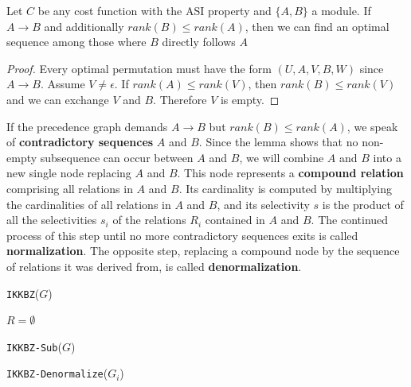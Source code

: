 \documentclass[11pt]{article}
\begin{document}
\begin{lemma}[]
\label{3.2.5}
Let \(C\) be any cost function with the ASI property and \(\{A,B\}\) a module. If \(A\to B\) and
additionally \(rank(B)\le rank(A)\), then we can find an optimal sequence among those where \(B\) directly
follows \(A\)
\end{lemma}

\begin{proof}
Every optimal permutation must have the form \((U,A,V,B,W)\) since \(A\to B\). Assume \(V\neq\epsilon\).
If \(rank(A)\le rank(V)\), then \(rank(B)\le rank(V)\) and we can exchange \(V\) and \(B\). Therefore \(V\) is empty.
\end{proof}

If the precedence graph demands \(A\to B\) but \(rank(B)\le rank(A)\), we speak of \textbf{contradictory
sequences} \(A\) and \(B\). Since the lemma shows that no non-empty subsequence can occur between \(A\)
and \(B\), we will combine \(A\) and \(B\) into a new single node replacing \(A\) and \(B\). This node
represents a \textbf{compound relation} comprising all relations in \(A\) and \(B\). Its cardinality is computed by
multiplying the cardinalities of all relations in \(A\) and \(B\), and its selectivity \(s\) is the
product of all the selectivities \(s_i\) of the relations \(R_i\) contained in \(A\) and \(B\). The
continued process of this step until no more contradictory sequences exits is called \textbf{normalization}. The
opposite step, replacing a compound node by the sequence of relations it was derived from, is called
\textbf{denormalization}.

\begin{algorithm}
\caption{\texttt{IKKBZ}(\(G\))}
\(R=\emptyset\)\;
\end{algorithm}

\begin{algorithm}
\caption{\texttt{IKKBZ-Sub}(\(G\))}
\texttt{IKKBZ-Denormalize}(\(G_i\))\;
\end{algorithm}
\end{document}
